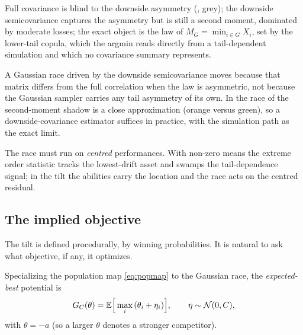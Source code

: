 \begin{remark}
\label{rem:twolayers}
Full covariance is blind to the downside asymmetry (, grey); the
downside semicovariance captures the asymmetry but is still a second moment,
dominated by moderate losses; the exact object is the law of
$M_G = \min_{i\in G} X_i$, set by the lower-tail copula, which the argmin reads
directly from a tail-dependent simulation and which no covariance summary
represents.

A Gaussian race driven by the downside semicovariance moves because that matrix
differs from the full correlation when the law is asymmetric, not because the
Gaussian sampler carries any tail asymmetry of its own. In the race of
 the second-moment shadow is a close approximation (orange versus
green), so a downside-covariance estimator suffices in practice, with the
simulation path as the exact limit.
\end{remark}

\begin{remark}[Centring]
\label{rem:centring}
The race must run on \emph{centred} performances. With non-zero means the extreme
order statistic tracks the lowest-drift asset and swamps the tail-dependence
signal; in the tilt the abilities carry the location and the race acts on the
centred residual.
\end{remark}

\subsection{The implied objective}
\label{sec:objective}

The tilt is defined procedurally, by winning probabilities. It is natural to ask
what objective, if any, it optimizes.

Specializing the population map \eqref{eq:popmap} to the Gaussian race, the
\emph{expected-best} potential is
\begin{equation}
  G_C(\theta) = \mathbb{E}\Big[\max_i\,(\theta_i + \eta_i)\Big], \qquad
  \eta \sim \mathcal{N}(0, C),
  \label{eq:surplus}
\end{equation}
with $\theta = -a$ (so a larger $\theta$ denotes a stronger competitor).


